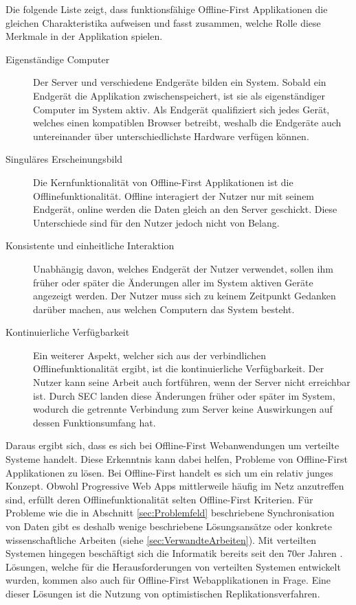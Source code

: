 \documentclass[a4paper, 12pt]{scrreprt}
\begin{document}
Die folgende Liste zeigt, dass funktionsfähige Offline-First Applikationen die gleichen Charakteristika aufweisen und fasst zusammen, welche Rolle diese Merkmale in der Applikation spielen.

\begin{description}		
\item[Eigenständige Computer] Der Server und verschiedene Endgeräte bilden ein System. Sobald ein Endgerät die Applikation zwischenspeichert, ist sie als eigenständiger Computer im System aktiv. Als Endgerät qualifiziert sich jedes Gerät, welches einen kompatiblen Browser betreibt, weshalb die Endgeräte auch untereinander über unterschiedlichste Hardware verfügen können.
\item[Singuläres Erscheinungsbild]Die Kernfunktionalität von Offline-First Applikationen ist die Offlinefunktionalität. Offline interagiert der Nutzer nur mit seinem Endgerät, online werden die Daten gleich an den Server geschickt. Diese Unterschiede sind für den Nutzer jedoch nicht von Belang. \item[Konsistente und einheitliche Interaktion]
Unabhängig davon, welches Endgerät der Nutzer verwendet, sollen ihm früher oder später die Änderungen aller im System aktiven Geräte angezeigt werden. Der Nutzer muss sich zu keinem Zeitpunkt Gedanken darüber machen, aus welchen Computern das System besteht.
\item[Kontinuierliche Verfügbarkeit]
Ein weiterer Aspekt, welcher sich aus der verbindlichen Offlinefunktionalität ergibt, ist die kontinuierliche Verfügbarkeit. Der Nutzer kann seine Arbeit auch fortführen, wenn der Server nicht erreichbar ist. Durch SEC landen diese Änderungen früher oder später im System, wodurch die getrennte Verbindung zum Server keine Auswirkungen auf dessen Funktionsumfang hat. 
\end{description}
\label{tab:charakteristikaOfflineFirst}

Daraus ergibt sich, dass es sich bei Offline-First Webanwendungen um verteilte Systeme handelt. Diese Erkenntnis kann dabei helfen, Probleme von Offline-First Applikationen zu lösen. Bei Offline-First handelt es sich um ein relativ junges Konzept. Obwohl Progressive Web Apps mittlerweile häufig im Netz anzutreffen sind, erfüllt deren Offlinefunktionalität selten Offline-First Kriterien. Für Probleme wie die in Abschnitt \ref{sec:Problemfeld} beschriebene Synchronisation von Daten gibt es deshalb wenige beschriebene Lösungsansätze oder konkrete wissenschaftliche Arbeiten (siehe \ref{sec:VerwandteArbeiten}). Mit verteilten Systemen hingegen beschäftigt sich die Informatik bereits seit den 70er Jahren \autocite{Andrews1999FoundationsOM}. Lösungen, welche für die Herausforderungen von verteilten Systemen entwickelt wurden, kommen also auch für Offline-First Webapplikationen in Frage. Eine dieser Lösungen ist die Nutzung von optimistischen Replikationsverfahren. 
\end{document}
